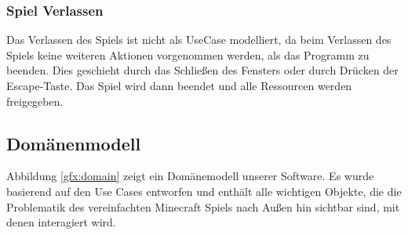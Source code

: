 \documentclass{article}
\begin{document}
\subsubsection*{Spiel Verlassen}

Das Verlassen des Spiels ist nicht als UseCase modelliert, da beim Verlassen des Spiels keine weiteren Aktionen vorgenommen werden, als das Programm zu beenden. Dies geschieht durch das Schlie\ss{}en des Fensters oder durch Drücken der Escape-Taste. Das Spiel wird dann beendet und alle Ressourcen werden freigegeben.

\subsection{Domänenmodell} \label{subsec:domain}

Abbildung \ref{gfx:domain} zeigt ein Domänemodell unserer Software. Es wurde basierend auf den Use Cases entworfen und enthält alle wichtigen Objekte, die die Problematik des vereinfachten Minecraft Spiels nach Au\ss{}en hin sichtbar sind, mit denen interagiert wird. 
\end{document}
